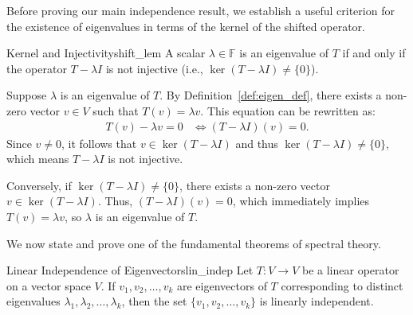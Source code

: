 \documentclass[10pt, letterpaper]{article}
\renewenvironment{proof}[1][\proofname]{%
  \begin{proofbox}{#1}%
}{%
  \end{proofbox}%
}
\begin{document}
Before proving our main independence result, we establish a useful criterion for the existence of eigenvalues in terms of the kernel of the shifted operator.

\begin{lemma}{Kernel and Injectivity}{shift_lem}
    A scalar $\lambda \in \mathbb{F}$ is an eigenvalue of $T$ if and only if the operator $T - \lambda I$ is not injective (i.e., $\ker(T - \lambda I) \neq \{0\}$).
\end{lemma}

\begin{proof}
    Suppose $\lambda$ is an eigenvalue of $T$. By Definition~\ref{def:eigen_def}, there exists a non-zero vector $v \in V$ such that $T(v) = \lambda v$. This equation can be rewritten as:
    \begin{align*}
        T(v) - \lambda v = 0 &\iff (T - \lambda I)(v) = 0.
    \end{align*}
    Since $v \neq 0$, it follows that $v \in \ker(T - \lambda I)$ and thus $\ker(T - \lambda I) \neq \{0\}$, which means $T - \lambda I$ is not injective.
    
    Conversely, if $\ker(T - \lambda I) \neq \{0\}$, there exists a non-zero vector $v \in \ker(T - \lambda I)$. Thus, $(T - \lambda I)(v) = 0$, which immediately implies $T(v) = \lambda v$, so $\lambda$ is an eigenvalue of $T$.
\end{proof}

We now state and prove one of the fundamental theorems of spectral theory.

\begin{theorem}{Linear Independence of Eigenvectors}{lin_indep}
    Let $T: V \to V$ be a linear operator on a vector space $V$. If $v_1, v_2, \dots, v_k$ are eigenvectors of $T$ corresponding to distinct eigenvalues $\lambda_1, \lambda_2, \dots, \lambda_k$, then the set $\{v_1, v_2, \dots, v_k\}$ is linearly independent.
\end{theorem}
\end{document}
